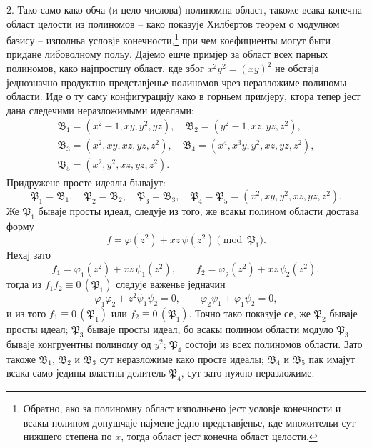 ﻿\documentclass[11pt]{article}
\newcommand{\ideal}[1]{\mathfrak{#1}}
\newcommand{\eqzero}[1]{\equiv 0\,(#1)}
\begin{document}
2. Тако само како обча (и цело-числова) полиномна област, такоже всака конечна област целости из полиномов -- како показује Хилбертов теорем о модулном базису -- изполньа условје конечности,\footnote{Обратно, ако за полиномну област изполньено јест условје конечности и всакы полином допушчаје најмене једно представјенье, кде множительи сут нижшего степена по \(x\), тогда област јест конечна област целости.} при чем коефициенты могут быти придане либоволному польу. Дајемо ешче примјер за област всех парных полиномов, како најпростшу област, кде због \(x^2y^2=(xy)^2\) не обстаја једнозначно продуктно представјенье полиномов чрез неразложиме полиномы области. Иде о ту саму конфигурацију како в горньем примјеру, ктора тепер јест дана следечими неразложимыми идеалами:
\[
\begin{gathered}
 \ideal B_1=(x^2-1,xy,y^2,yz),\quad
 \ideal B_2=(y^2-1,xz,yz,z^2),\\
 \ideal B_3=(x^2,xy,xz,yz,z^2),\quad
 \ideal B_4=(x^4,x^3y,y^2,xz,yz,z^2),\\
 \ideal B_5=(x^2,y^2,xz,yz,z^2).
\end{gathered}
\]
Придружене просте идеалы бывајут:
\[
 \ideal P_1=\ideal B_1,
 \quad \ideal P_2=\ideal B_2,
 \quad \ideal P_3=\ideal B_3,
 \quad \ideal P_4=\ideal P_5=(x^2,xy,y^2,xz,yz,z^2).
\]
Же \(\ideal P_1\) бываје просты идеал, следује из того, же всакы полином области достава форму
\[
 f=\varphi(z^2)+xz\,\psi(z^2)\pmod{\ideal P_1}.
\]
Нехај зато
\[
 f_1=\varphi_1(z^2)+xz\,\psi_1(z^2),
 \qquad
 f_2=\varphi_2(z^2)+xz\,\psi_2(z^2),
\]
тогда из \(f_1f_2\eqzero{\ideal P_1}\) следује важенье једначин
\[
 \varphi_1\varphi_2+z^2\psi_1\psi_2=0,
 \qquad
 \varphi_2\psi_1+\varphi_1\psi_2=0,
\]
и из того \(f_1\eqzero{\ideal P_1}\) или \(f_2\eqzero{\ideal P_1}\). Точно тако показује се, же \(\ideal P_2\) бываје просты идеал; \(\ideal P_3\) бываје просты идеал, бо всакы полином области модуло \(\ideal P_3\) бываје конгруентны полиному од \(y^2\); \(\ideal P_4\) состоји из всех полиномов области. Зато такоже \(\ideal B_1\), \(\ideal B_2\) и \(\ideal B_3\) сут неразложиме како просте идеалы; \(\ideal B_4\) и \(\ideal B_5\) пак имајут всака само једины властны делитель \(\ideal P_4\), сут зато нужно неразложиме.
\end{document}
